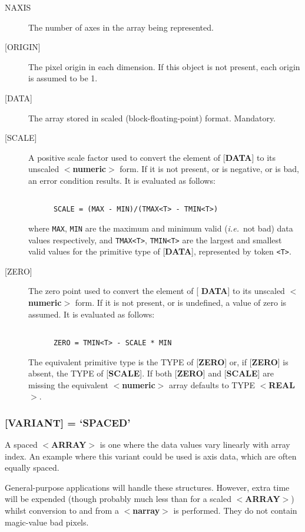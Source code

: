 \documentclass[twoside,11pt]{article}
\renewcommand{\_}{\texttt{\symbol{95}}}
\begin{document}
\begin{description}
\item [NAXIS]
The number of axes in the array being represented.
\item [{[}ORIGIN{]}]
The pixel origin in each dimension.  If this object is not present,
each origin is assumed to be 1. 
\item [{[}DATA{]}] 
The array stored in scaled (block-floating-point) format. Mandatory.
\item [{[}SCALE{]}]
A positive scale factor used to convert the element of
{[}{\bf DATA}{]} to its
unscaled $<${\bf numeric}$>$ form.  If it is not present,
or is negative, or is bad, an error condition results.
It is evaluated as follows:
\begin{verbatim}

      SCALE = (MAX - MIN)/(TMAX<T> - TMIN<T>)

\end{verbatim}
where {\tt MAX}, {\tt MIN} are the maximum and minimum valid ({\it i.e.}\  not bad)
data values respectively, and {\tt TMAX<T>}, {\tt TMIN<T>}  are
the largest and smallest valid values for the primitive type of {[}{\bf DATA}{]}, represented
by token {\tt <T>}.
\item [{[}ZERO{]}]
The zero point used to convert the element of {[}{\bf
DATA}{]} to its unscaled $<${\bf numeric}$>$ form.  If it is not
present,
or is undefined, a value of zero is assumed.  It is evaluated as follows:
\begin{verbatim}

      ZERO = TMIN<T> - SCALE * MIN

\end{verbatim}

The equivalent primitive type is the TYPE of {[}{\bf ZERO}{]} or, if
{[}{\bf ZERO}{]} is absent, the TYPE of {[}{\bf SCALE}{]}.  If both
{[}{\bf ZERO}{]} and {[}{\bf SCALE}{]} are missing the equivalent
$<${\bf numeric}$>$ array defaults to TYPE $<${\bf \_REAL}$>$. 
\end{description}

\subsubsection{{[}{\bf VARIANT}{]} = `SPACED'}
A spaced \mbox{$<${\bf ARRAY}$>$} is one where the data values
vary linearly with array index.
An example where this variant could be used is axis data, which are
often equally spaced.

General-purpose applications will handle these structures.  However,
extra time will be expended (though probably much less than for a
scaled \mbox{$<${\bf ARRAY}$>$}) whilst conversion to
and from a $<${\bf narray}$>$ is performed.
They do not contain magic-value bad pixels.
\end{document}
